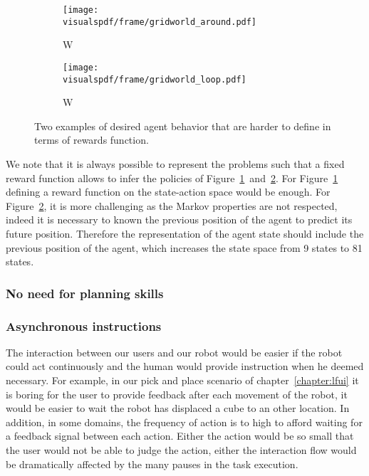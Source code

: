 \begin{figure}[!htbp]
\centering
    \begin{subfigure}[b]{0.49\columnwidth}
        \centering
        \texttt{[image: \\visualspdf/frame/gridworld\_around.pdf]}
        \caption{W}
        \label{fig:gridwolrdgenericframesaround}
    \end{subfigure}
    \begin{subfigure}[b]{0.49\columnwidth}
        \centering
        \texttt{[image: \\visualspdf/frame/gridworld\_loop.pdf]}
        \caption{W}
        \label{fig:gridwolrdgenericframesloop}
    \end{subfigure}
\caption{Two examples of desired agent behavior that are harder to define in terms of rewards function.}
\label{fig:gridwolrdgenericframes}
\end{figure}

We note that it is always possible to represent the problems such that a fixed reward function allows to infer the policies of Figure~\ref{fig:gridwolrdgenericframesaround}~and~\ref{fig:gridwolrdgenericframesloop}. For Figure~\ref{fig:gridwolrdgenericframesaround} defining a reward function on the state-action space would be enough. For Figure~\ref{fig:gridwolrdgenericframesloop}, it is more challenging as the Markov properties are not respected, indeed it is necessary to known the previous position of the agent to predict its future position. Therefore the representation of the agent state should include the previous position of the agent, which increases the state space from 9 states to 81 states.

\subsubsection*{No need for planning skills}

\subsubsection*{Asynchronous instructions}

The interaction between our users and our robot would be easier if the robot could act continuously and the human would provide instruction when he deemed necessary. For example, in our pick and place scenario of chapter~\ref{chapter:lfui} it is boring for the user to provide feedback after each movement of the robot, it would be easier to wait the robot has displaced a cube to an other location. In addition, in some domains, the frequency of action is to high to afford waiting for a feedback signal between each action. Either the action would be so small that the user would not be able to judge the action, either the interaction flow would be dramatically affected by the many pauses in the task execution.

